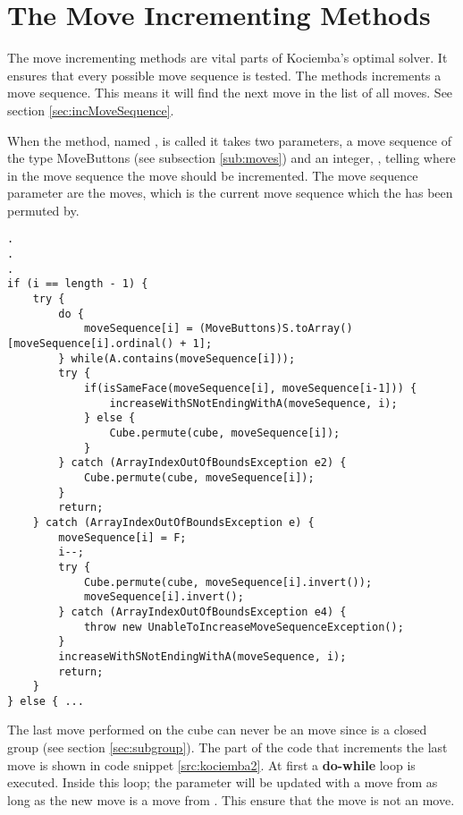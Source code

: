 \section{The Move Incrementing Methods}
\label{sec:increaseWithSNotEndingWithA}
The move incrementing methods are vital parts of Kociemba's optimal solver. 
It ensures that every possible move sequence is tested.
The methods increments a move sequence. This means it will find the next move in the list of all moves. See section \ref{sec:incMoveSequence}.


When the method, named , is called it takes two parameters, a move sequence of the type MoveButtons (see subsection \ref{sub:moves}) and an integer, , telling where in the move sequence the move should be incremented. 
The move sequence parameter are the moves, which is the current move sequence which the \cube{} has been permuted by.

\begin{lstlisting}[style=sourceCode, caption=\myCaption{Key point in the incrementing method of kociemba's optimal solver}, label=src:kociemba2]
.
.
.
if (i == length - 1) {
	try {
		do {
			moveSequence[i] = (MoveButtons)S.toArray()[moveSequence[i].ordinal() + 1];
		} while(A.contains(moveSequence[i]));
		try {
			if(isSameFace(moveSequence[i], moveSequence[i-1])) {
				increaseWithSNotEndingWithA(moveSequence, i);
			} else {
				Cube.permute(cube, moveSequence[i]);
			}
		} catch (ArrayIndexOutOfBoundsException e2) {
			Cube.permute(cube, moveSequence[i]);
		}
		return;
	} catch (ArrayIndexOutOfBoundsException e) {
		moveSequence[i] = F;
		i--;
		try {
			Cube.permute(cube, moveSequence[i].invert());
			moveSequence[i].invert();
		} catch (ArrayIndexOutOfBoundsException e4) {
			throw new UnableToIncreaseMoveSequenceException();
		}
		increaseWithSNotEndingWithA(moveSequence, i);
		return;
	}
} else { ...
\end{lstlisting}

The last move performed on the cube can never be an  move since  is a closed group (see section \ref{sec:subgroup}). The part of the code that increments the last move is shown in code snippet \ref{src:kociemba2}.
At first a \textbf{do-while} loop is executed. 
Inside this loop; the parameter  will be updated with a move from  as long as the new move is a move from . This ensure that the move is not an  move.

